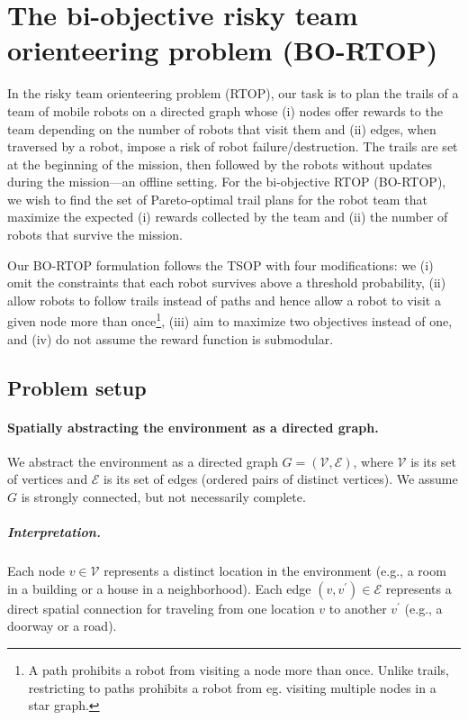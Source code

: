 \documentclass[11pt, oneside]{article}
\begin{document}
\section{The bi-objective risky team orienteering problem (BO-RTOP)}
In the risky team orienteering problem (RTOP), our task is to plan the trails of a team of mobile robots on a directed graph whose (i) nodes offer rewards to the team depending on the number of robots that visit them and (ii) edges, when traversed by a robot, impose a risk of robot failure/destruction.
The trails are set at the beginning of the mission, then followed by the robots without updates during the mission---an offline setting. 
For the bi-objective RTOP (BO-RTOP), we wish to find the set of Pareto-optimal trail plans for the robot team that maximize the expected (i) rewards collected by the team and (ii) the number of robots that survive the mission.

Our BO-RTOP formulation follows the TSOP \cite{jorgensen2018team} with four modifications: we (i) omit the constraints that each robot survives above a threshold probability, (ii) allow robots to follow trails instead of paths and hence allow a robot to visit a given node more than once\footnote{A path prohibits a robot from visiting a node more than once. Unlike trails, restricting to paths prohibits a robot from eg. visiting multiple nodes in a star graph.}, (iii) aim to maximize two objectives instead of one, and (iv) do not assume the reward function is submodular. 




\subsection{Problem setup}


\paragraph{Spatially abstracting the environment as a directed graph.}
We abstract the environment as a directed graph $G=(\mathcal{V}, \mathcal{E})$, where $\mathcal{V}$ is its set of vertices and $\mathcal{E}$ is its set of edges (ordered pairs of distinct vertices). We assume $G$ is strongly connected, but not necessarily complete.

\vspace{-\baselineskip}
\subparagraph{Interpretation.} 
Each node $v\in \mathcal{V}$ represents a distinct location in the environment (e.g., a room in a building or a house in a neighborhood).
Each edge $(v, v^\prime) \in \mathcal{E}$ represents a direct spatial connection for traveling from one location $v$ to another $v^\prime$ (e.g., a doorway or a road).
\end{document}
